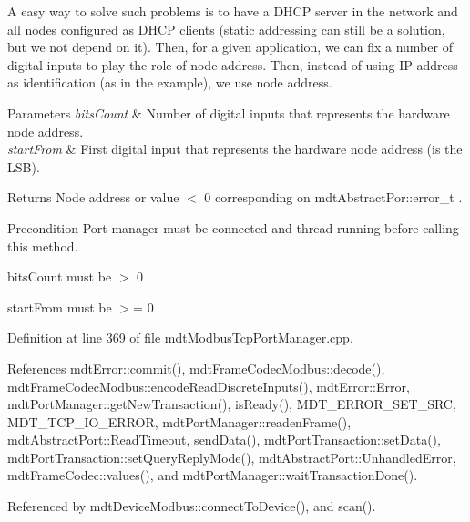 A easy way to solve such problems is to have a D\-H\-C\-P server in the network and all nodes configured as D\-H\-C\-P clients (static addressing can still be a solution, but we not depend on it). Then, for a given application, we can fix a number of digital inputs to play the role of node address. Then, instead of using I\-P address as identification (as in the example), we use node address.


\begin{DoxyParams}{Parameters}
{\em bits\-Count} & Number of digital inputs that represents the hardware node address. \\
\hline
{\em start\-From} & First digital input that represents the hardware node address (is the L\-S\-B). \\
\hline
\end{DoxyParams}
\begin{DoxyReturn}{Returns}
Node address or value $<$ 0 corresponding on mdt\-Abstract\-Por\-::error\-\_\-t . 
\end{DoxyReturn}
\begin{DoxyPrecond}{Precondition}
Port manager must be connected and thread running before calling this method. 

bits\-Count must be $>$ 0 

start\-From must be $>$= 0 
\end{DoxyPrecond}


Definition at line 369 of file mdt\-Modbus\-Tcp\-Port\-Manager.\-cpp.



References mdt\-Error\-::commit(), mdt\-Frame\-Codec\-Modbus\-::decode(), mdt\-Frame\-Codec\-Modbus\-::encode\-Read\-Discrete\-Inputs(), mdt\-Error\-::\-Error, mdt\-Port\-Manager\-::get\-New\-Transaction(), is\-Ready(), M\-D\-T\-\_\-\-E\-R\-R\-O\-R\-\_\-\-S\-E\-T\-\_\-\-S\-R\-C, M\-D\-T\-\_\-\-T\-C\-P\-\_\-\-I\-O\-\_\-\-E\-R\-R\-O\-R, mdt\-Port\-Manager\-::readen\-Frame(), mdt\-Abstract\-Port\-::\-Read\-Timeout, send\-Data(), mdt\-Port\-Transaction\-::set\-Data(), mdt\-Port\-Transaction\-::set\-Query\-Reply\-Mode(), mdt\-Abstract\-Port\-::\-Unhandled\-Error, mdt\-Frame\-Codec\-::values(), and mdt\-Port\-Manager\-::wait\-Transaction\-Done().



Referenced by mdt\-Device\-Modbus\-::connect\-To\-Device(), and scan().

